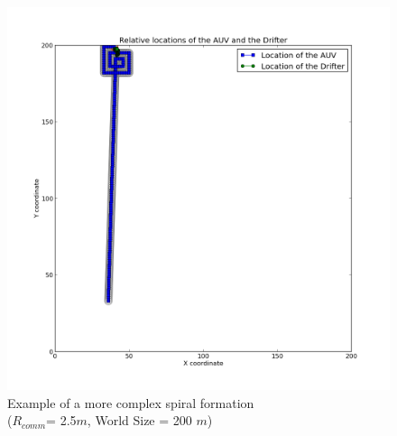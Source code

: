 \documentclass[a4paper, 11pt]{article} %
\begin{document}
\begin{figure}[H]
	\begin{center}
		\includegraphics[scale=0.30]{rcomm25_1.png}
	\end{center}
\caption{Example of a more complex spiral formation\\ ($R_{comm}$= 2.5$m$, World Size = 200 $m$) \label{complexSpiral2.5}}
\end{figure}
\end{document}
